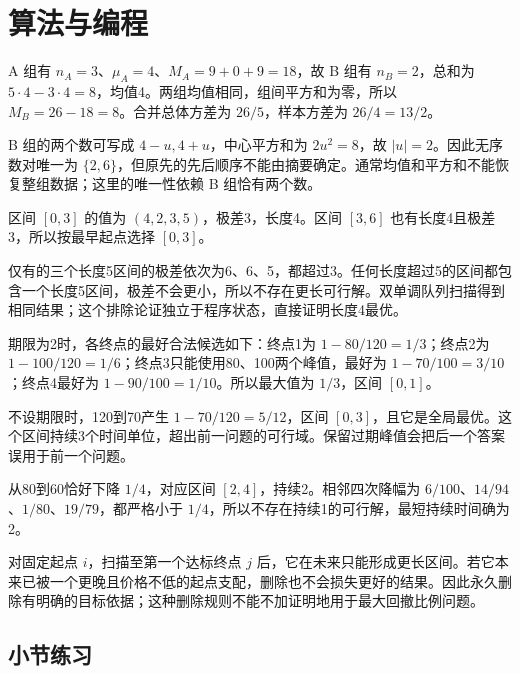 \section{算法与编程}

A 组有 $n_A=3$、$\mu_A=4$、$M_A=9+0+9=18$，故 B 组有 $n_B=2$，总和为 $5\cdot4-3\cdot4=8$，均值4。两组均值相同，组间平方和为零，所以 $M_B=26-18=8$。合并总体方差为 $26/5$，样本方差为 $26/4=13/2$。

B 组的两个数可写成 $4-u,4+u$，中心平方和为 $2u^2=8$，故 $|u|=2$。因此无序数对唯一为 $\{2,6\}$，但原先的先后顺序不能由摘要确定。通常均值和平方和不能恢复整组数据；这里的唯一性依赖 B 组恰有两个数。

区间 $[0,3]$ 的值为 $(4,2,3,5)$，极差3，长度4。区间 $[3,6]$ 也有长度4且极差3，所以按最早起点选择 $[0,3]$。

仅有的三个长度5区间的极差依次为6、6、5，都超过3。任何长度超过5的区间都包含一个长度5区间，极差不会更小，所以不存在更长可行解。双单调队列扫描得到相同结果；这个排除论证独立于程序状态，直接证明长度4最优。

期限为2时，各终点的最好合法候选如下：终点1为 $1-80/120=1/3$；终点2为 $1-100/120=1/6$；终点3只能使用80、100两个峰值，最好为 $1-70/100=3/10$；终点4最好为 $1-90/100=1/10$。所以最大值为 $1/3$，区间 $[0,1]$。

不设期限时，120到70产生 $1-70/120=5/12$，区间 $[0,3]$，且它是全局最优。这个区间持续3个时间单位，超出前一问题的可行域。保留过期峰值会把后一个答案误用于前一个问题。

从80到60恰好下降 $1/4$，对应区间 $[2,4]$，持续2。相邻四次降幅为 $6/100$、$14/94$、$1/80$、$19/79$，都严格小于 $1/4$，所以不存在持续1的可行解，最短持续时间确为2。

对固定起点 $i$，扫描至第一个达标终点 $j$ 后，它在未来只能形成更长区间。若它本来已被一个更晚且价格不低的起点支配，删除也不会损失更好的结果。因此永久删除有明确的目标依据；这种删除规则不能不加证明地用于最大回撤比例问题。

\par{}
\subsection*{小节练习}



